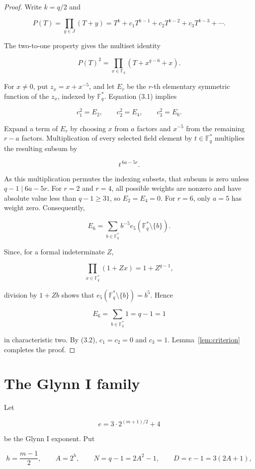 \documentclass[11pt]{article}
\begin{document}
\begin{proof}

Write \(k=q/2\) and

\[
P(T)=\prod_{y\in J}(T+y)
=T^k+c_1T^{k-1}+c_2T^{k-2}+c_3T^{k-3}+\cdots.
\]

The two-to-one property gives the multiset identity

\[
P(T)^2=\prod_{x\in\mathbb F_q}(T+x^{q-6}+x).
\tag{3.1}
\]

For \(x\ne0\), put \(z_x=x+x^{-5}\), and let \(E_r\) be the \(r\)-th
elementary symmetric function of the \(z_x\), indexed by
\(\mathbb F_q^*\). Equation (3.1) implies

\[
c_1^2=E_2,\qquad c_2^2=E_4,\qquad c_3^2=E_6.
\tag{3.2}
\]

Expand a term of \(E_r\) by choosing \(x\) from \(a\) factors and \(x^{-5}\)
from the remaining \(r-a\) factors. Multiplication of every selected field
element by \(t\in\mathbb F_q^*\) multiplies the resulting subsum by

\[
t^{\,6a-5r}.
\]

As this multiplication permutes the indexing subsets, that subsum is zero
unless \(q-1\mid 6a-5r\). For \(r=2\) and \(r=4\), all possible weights are
nonzero and have absolute value less than \(q-1\ge31\), so \(E_2=E_4=0\).
For \(r=6\), only \(a=5\) has weight zero. Consequently,

\[
E_6=\sum_{b\in\mathbb F_q^*}b^{-5}
e_5(\mathbb F_q^*\setminus\{b\}).
\]

Since, for a formal indeterminate \(Z\),

\[
\prod_{x\in\mathbb F_q^*}(1+Zx)=1+Z^{q-1},
\]

division by \(1+Zb\) shows that
\(e_5(\mathbb F_q^*\setminus\{b\})=b^5\). Hence

\[
E_6=\sum_{b\in\mathbb F_q^*}1=q-1=1
\]

in characteristic two. By (3.2), \(c_1=c_2=0\) and \(c_3=1\). Lemma~\ref{lem:criterion}
completes the proof.
\end{proof}


\section{The Glynn I family}


Let

\[
e=3\cdot2^{(m+1)/2}+4
\]

be the Glynn I exponent. Put

\[
h=\frac{m-1}{2},\qquad A=2^h,\qquad
N=q-1=2A^2-1,\qquad D=e-1=3(2A+1),
\]
\end{document}
